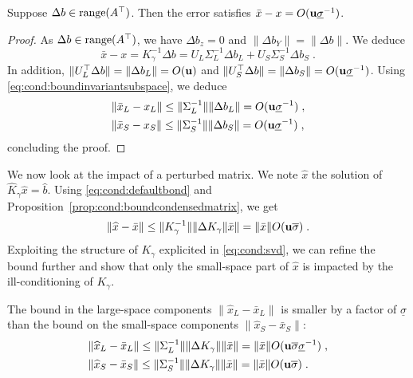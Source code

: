 \begin{proposition}
  \label{prop:cond:rhsperturb}
  Suppose $\Delta b \in \operatorname{range}(A^\top)$. Then the
  error satisfies
  $\bar{x} - x = O(\mathbf{u} \underline{\sigma}^{-1})$.
\end{proposition}
\begin{proof}
  As $\Delta b \in \operatorname{range}(A^\top)$, we have $\Delta b_z = 0$
  and $\|\Delta b_Y \| = \|\Delta b \|$. We deduce
  \begin{equation}
    \bar{x} - x = K_\gamma^{-1} \Delta b =
    U_L \Sigma_L^{-1} \Delta b_L  +
    U_S \Sigma_S^{-1} \Delta b_S  \; .
  \end{equation}
  In addition, $\| U_L^\top \Delta b \| = \| \Delta b_L \| = O(\mathbf{u})$
and $\| U_S^\top \Delta b \| = \| \Delta b_S \| = O(\mathbf{u} \underline{\sigma}^{-1})$.
  Using \eqref{eq:cond:boundinvariantsubspace}, we deduce
  \begin{equation}
    \begin{aligned}
    & \| \bar{x}_L - x_L \| \leq \|\Sigma_L^{-1} \|\|\Delta b_L \| = O(\mathbf{u} \underline{\sigma}^{-1}) \;, \\
    & \| \bar{x}_S - x_S \| \leq \|\Sigma_S^{-1} \|\|\Delta b_S \| = O(\mathbf{u} \underline{\sigma}^{-1}) \;,
    \end{aligned}
  \end{equation}
  concluding the proof.
\end{proof}
We now look at the impact of a perturbed matrix.
We note $\widehat{x}$ the solution of $\widehat{K}_\gamma \widehat{x} = \widehat{b}$.
Using \eqref{eq:cond:defaultbond} and Proposition~\ref{prop:cond:boundcondensedmatrix}, we get
\begin{equation}
  \| \widehat{x} - \bar{x} \| \leq \|K_\gamma^{-1} \| \|\Delta K_\gamma \| \bar{x} \|
  = \| \bar{x} \| O(\mathbf{u} \overline{\sigma}) \; .
\end{equation}
Exploiting the structure of $K_\gamma$ explicited in \eqref{eq:cond:svd},
we can refine the bound further and show that only the small-space
part of $\widehat{x}$ is impacted by the ill-conditioning of $K_\gamma$.
\begin{proposition}
  \label{prop:cond:matrixperturb}
  The bound in the large-space components $\|\widehat{x}_L - \bar{x}_L \|$
  is smaller by a factor of $\underline{\sigma}$ than the bound
  on the small-space components
   $\|\widehat{x}_S - \bar{x}_S \|$:
  \begin{equation}
    \begin{aligned}
    & \| \widehat{x}_L - \bar{x}_L  \| \leq \|\Sigma_L^{-1} \|\|\Delta K_\gamma \|\|\bar{x} \| = \| \bar{x} \| O(\mathbf{u} \overline{\sigma} \underline{\sigma}^{-1}) \;, \\
    & \| \widehat{x}_S - \bar{x}_S  \| \leq \|\Sigma_S^{-1} \|\|\Delta K_\gamma \|\|\bar{x} \| = \| \bar{x} \| O(\mathbf{u} \overline{\sigma}) \;.
    \end{aligned}
  \end{equation}

\end{proposition}
